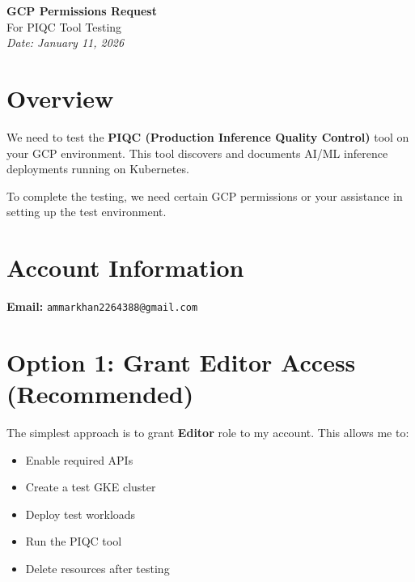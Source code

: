 \documentclass[11pt,a4paper]{article}
\begin{document}
\begin{center}
    {\LARGE\textbf{GCP Permissions Request}}\\[0.5em]
    {\Large For PIQC Tool Testing}\\[1em]
    \textit{Date: January 11, 2026}
\end{center}

\vspace{1em}

\section{Overview}

We need to test the \textbf{PIQC (Production Inference Quality Control)} tool on your GCP environment. This tool discovers and documents AI/ML inference deployments running on Kubernetes.

To complete the testing, we need certain GCP permissions or your assistance in setting up the test environment.

\section{Account Information}

\begin{tcolorbox}[colback=backcolour,colframe=black!50,title=\textbf{Account to Grant Access}]
\textbf{Email:} \texttt{ammarkhan2264388@gmail.com}
\end{tcolorbox}

\section{Option 1: Grant Editor Access (Recommended)}

The simplest approach is to grant \textbf{Editor} role to my account. This allows me to:
\begin{itemize}
    \item Enable required APIs
    \item Create a test GKE cluster
    \item Deploy test workloads
    \item Run the PIQC tool
    \item Delete resources after testing
\end{itemize}
\end{document}
